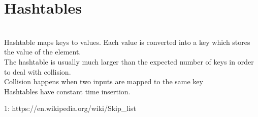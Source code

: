 \section{Hashtables}
\\ Hashtable maps keys to values. Each value is converted into a key which stores the value of the element.
\\ The hashtable is usually much larger than the expected number of keys in order to deal with collision.
\\ Collision happens when two inputs are mapped to the same key
\\Hashtables have constant time insertion.

1: https://en.wikipedia.org/wiki/Skip\_list


